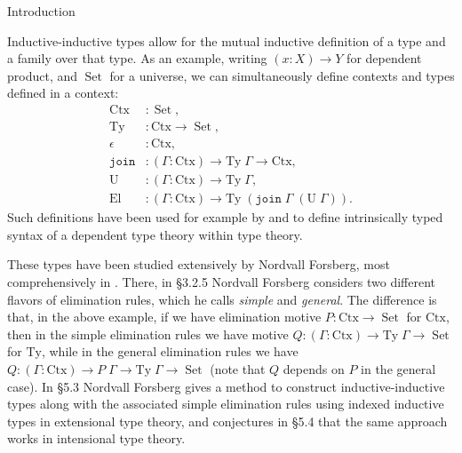 \documentclass[acmsmall,review]{acmart}\settopmatter{printfolios=true,printccs=false,printacmref=false}
\DeclareMathOperator{\USet}{Set}
\newcommand{\join}{\texttt{join}}
\def\Forsberg/{Nordvall Forsberg}
\begin{document}
\begin{section}{Introduction}

Inductive-inductive types allow for the mutual inductive definition of a type and a family over that type. As an example, writing $(x : X) \to Y$ for dependent product, and $\USet$ for a universe, we can simultaneously define contexts and types defined in a context:
\begin{align*}
\text{Ctx} &: \USet,\\
\text{Ty} &: \text{Ctx} \to \USet,\\
\epsilon &: \text{Ctx},\\
\join &: (\Gamma : \text{Ctx}) \to \text{Ty}\; \Gamma \to \text{Ctx},\\
\text{U} &: (\Gamma : \text{Ctx}) \to \text{Ty}\;\Gamma,\\
\text{El} &: (\Gamma : \text{Ctx}) \to \text{Ty}\;(\join\;\Gamma\;(\text{U}\;\Gamma)).
\end{align*}
Such definitions have been used for example by \citet{danielssonIRdeptype} and \citet{CHAPMAN200921} to define intrinsically typed syntax of a dependent type theory within type theory.

These types have been studied extensively by \Forsberg/, most comprehensively in \citet{nordvallforsberg2013thesis}. There, in \S3.2.5 \Forsberg/ considers two different flavors of elimination rules, which he calls \emph{simple} and \emph{general}. The difference is that, in the above example, if we have elimination motive $P : \text{Ctx} \to \USet$ for $\text{Ctx}$, then in the simple elimination rules we have motive $Q : (\Gamma : \text{Ctx}) \to \text{Ty}\;\Gamma \to \USet$ for $\text{Ty}$, while in the general elimination rules we have $Q : (\Gamma : \text{Ctx}) \to P\;\Gamma \to \text{Ty}\;\Gamma \to \USet$ (note that $Q$ depends on $P$ in the general case). In \S5.3 \Forsberg/ gives a method to construct inductive-inductive types along with the associated simple elimination rules using indexed inductive types in extensional type theory, and conjectures in \S5.4 that the same approach works in intensional type theory.


\end{section}
\end{document}
